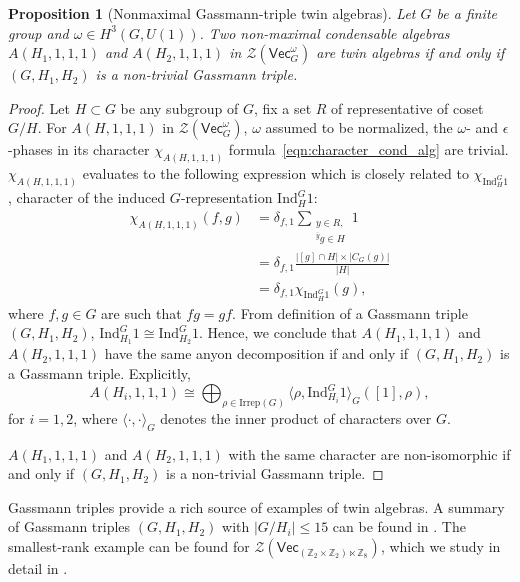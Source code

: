 \documentclass[aps,twocolumn,prx,floatfix,preprintnumbers, nofootinbib,10pt]{revtex4-2}
\numberwithin{equation}{section}
\newtheorem{proposition}[theorem]{Proposition}
\theoremstyle{definition}
\newcommand{\be}{\begin{equation}}
\newcommand{\ee}{\end{equation}}
\newcommand{\nn}{\nonumber}
\newcommand{\Z}{{\mathbb Z}}
\newcommand{\cZ}{\mathcal{Z}}
\renewcommand{\Vec}{\mathsf{Vec}}
\begin{document}
\begin{proposition}[Nonmaximal Gassmann-triple twin algebras]
\label{prop:Gassmann}
    Let $G$ be a finite group and $\omega\in H^3(G, U(1))$.
    Two non-maximal condensable algebras $A(H_1,1,1,1)$ and $A(H_2,1,1,1)$
    in $\cZ(\Vec_G^\omega)$ are twin algebras if and only if 
    $(G,H_1,H_2)$ is a non-trivial Gassmann triple. 
\end{proposition}
\begin{proof}
    Let $H\subset G$ be any subgroup of $G$, fix a set $R$ of representative of coset $G/H$.
    For $A(H,1,1,1)$ in $\cZ(\Vec_G^\omega)$, $\omega$ assumed to be normalized, the $\omega$- and $\epsilon$-phases in its character $\chi_{A(H,1,1,1)}$ formula~\eqref{eqn:character_cond_alg} are trivial. $\chi_{A(H,1,1,1)}$ evaluates to the following expression which is closely related to $\chi_{\text{Ind}^G_{H}1}$, character of the induced $G$-representation $\text{Ind}^G_{H}1$:
    \begin{align}
        \chi_{A(H,1,1,1)}(f,g) & = \delta_{f,1} \sum_{\substack{y\in R,\\ {}^{\bar{y}}g\in H}}1 \nn\\
        & = \delta_{f,1} \frac{|[g]\cap H|\times |C_G(g)|}{|H|} \nn\\
        & = \delta_{f,1} \chi_{\text{Ind}^G_{H}1}(g),
    \end{align}
    where $f,g\in G$ are such that $fg=gf$. From definition of a Gassmann triple $(G, H_1, H_2)$, $\text{Ind}^G_{H_1}1\cong \text{Ind}^G_{H_2}1$. Hence, we conclude that $A(H_1,1,1,1)$ and $A(H_2,1,1,1)$ have the same anyon decomposition if and only if $(G, H_1, H_2)$ is a Gassmann triple. Explicitly, 
    \be
        A(H_i,1,1,1) \cong \bigoplus_{\rho \in \text{Irrep}(G)}\langle\rho, \text{Ind}^G_{H_i}1\rangle_G ([1],\rho),
    \ee
    for $i=1,2$, where $\langle\cdot, \cdot \rangle_G$ denotes the inner product of characters over $G$. 
    
    $A(H_1,1,1,1)$ and $A(H_2,1,1,1)$ with the same character are non-isomorphic if and only if $(G, H_1, H_2)$ is a non-trivial Gassmann triple.
\end{proof}



    Gassmann triples provide a rich source of examples of twin algebras. A summary of Gassmann triples $(G,H_1,H_2)$ with $|G/H_i|\leq 15$ can be found in \cite{Bosma:2002GassmannNF}.
    The smallest-rank example can be found for $\cZ(\Vec_{(\Z_2\times \Z_2) \ltimes \Z_8})$, which we study in detail in .
\end{document}
